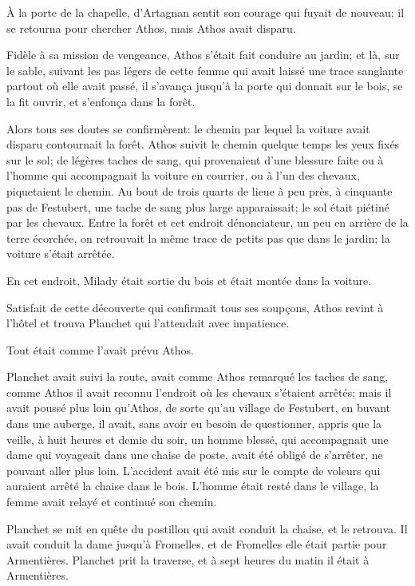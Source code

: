 À la porte de la chapelle, d'Artagnan sentit son courage qui fuyait de nouveau; il se retourna pour chercher Athos, mais Athos avait disparu. 

Fidèle à sa mission de vengeance, Athos s'était fait conduire au jardin; et là, sur le sable, suivant les pas légers de cette femme qui avait laissé une trace sanglante partout où elle avait passé, il s'avança jusqu'à la porte qui donnait sur le bois, se la fit ouvrir, et s'enfonça dans la forêt. 

Alors tous ses doutes se confirmèrent: le chemin par lequel la voiture avait disparu contournait la forêt. Athos suivit le chemin quelque temps les yeux fixés sur le sol; de légères taches de sang, qui provenaient d'une blessure faite ou à l'homme qui accompagnait la voiture en courrier, ou à l'un des chevaux, piquetaient le chemin. Au bout de trois quarts de lieue à peu près, à cinquante pas de Festubert, une tache de sang plus large apparaissait; le sol était piétiné par les chevaux. Entre la forêt et cet endroit dénonciateur, un peu en arrière de la terre écorchée, on retrouvait la même trace de petits pas que dans le jardin; la voiture s'était arrêtée. 

En cet endroit, Milady était sortie du bois et était montée dans la voiture. 

Satisfait de cette découverte qui confirmait tous ses soupçons, Athos revint à l'hôtel et trouva Planchet qui l'attendait avec impatience. 

Tout était comme l'avait prévu Athos. 

Planchet avait suivi la route, avait comme Athos remarqué les taches de sang, comme Athos il avait reconnu l'endroit où les chevaux s'étaient arrêtés; mais il avait poussé plus loin qu'Athos, de sorte qu'au village de Festubert, en buvant dans une auberge, il avait, sans avoir eu besoin de questionner, appris que la veille, à huit heures et demie du soir, un homme blessé, qui accompagnait une dame qui voyageait dans une chaise de poste, avait été obligé de s'arrêter, ne pouvant aller plus loin. L'accident avait été mis sur le compte de voleurs qui auraient arrêté la chaise dans le bois. L'homme était resté dans le village, la femme avait relayé et continué son chemin. 

Planchet se mit en quête du postillon qui avait conduit la chaise, et le retrouva. Il avait conduit la dame jusqu'à Fromelles, et de Fromelles elle était partie pour Armentières. Planchet prit la traverse, et à sept heures du matin il était à Armentières. 

